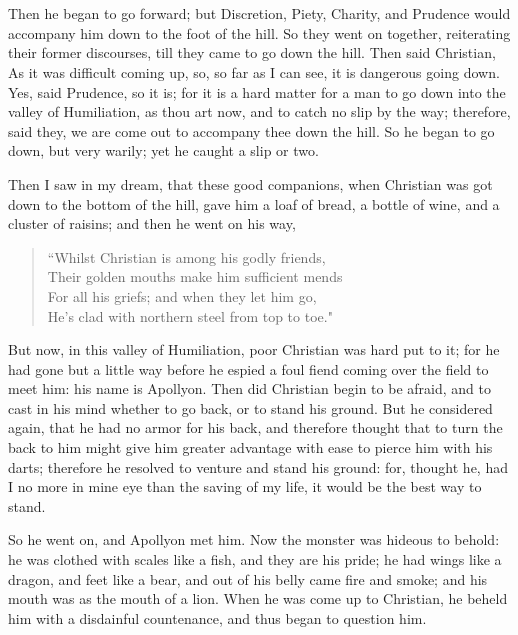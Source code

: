 \chapter[THE FOURTH STAGE]{}

Then he began to go forward; but Discretion, Piety, Charity, and Prudence would accompany him down to the foot of the hill. So they went on together, reiterating their former discourses, till they came to go down the hill. Then said Christian, As it was difficult coming up, so, so far as I can see, it is dangerous going down. Yes, said Prudence, so it is; for it is a hard matter for a man to go down into the valley of Humiliation, as thou art now, and to catch no slip by the way; therefore, said they, we are come out to accompany thee down the hill. So he began to go down, but very warily; yet he caught a slip or two.

Then I saw in my dream, that these good companions, when Christian was got down to the bottom of the hill, gave him a loaf of bread, a bottle of wine, and a cluster of raisins; and then he went on his way, 
\begin{verse} 
``Whilst Christian is among his godly friends,\\
Their golden mouths make him sufficient mends\\
For all his griefs; and when they let him go,\\
He's clad with northern steel from top to toe."\\
\end{verse} 
But now, in this valley of Humiliation, poor Christian was hard put to it; for he had gone but a little way before he espied a foul fiend coming over the field to meet him: his name is Apollyon. Then did Christian begin to be afraid, and to cast in his mind whether to go back, or to stand his ground. But he considered again, that he had no armor for his back, and therefore thought that to turn the back to him might give him greater advantage with ease to pierce him with his darts; therefore he resolved to venture and stand his ground: for, thought he, had I no more in mine eye than the saving of my life, it would be the best way to stand.

So he went on, and Apollyon met him. Now the monster was hideous to behold: he was clothed with scales like a fish, and they are his pride; he had wings like a dragon, and feet like a bear, and out of his belly came fire and smoke; and his mouth was as the mouth of a lion. When he was come up to Christian, he beheld him with a disdainful countenance, and thus began to question him.

